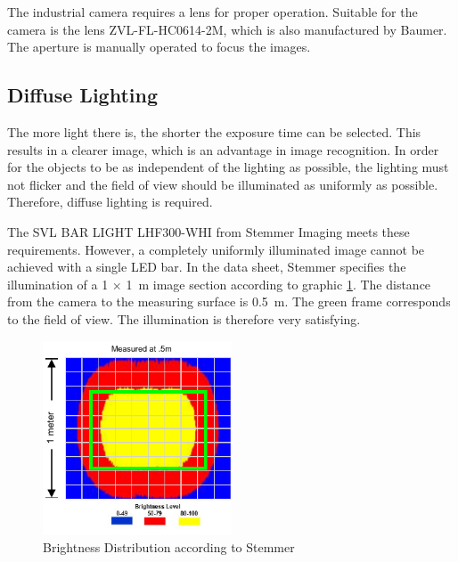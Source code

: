 The industrial camera requires a lens for proper operation.
Suitable for the camera is the lens ZVL-FL-HC0614-2M, which is also manufactured by Baumer.
The aperture is manually operated to focus the images.

\subsection{Diffuse Lighting}
\label{subsec:Lighting}
The more light there is, the shorter the exposure time can be selected.
This results in a clearer image, which is an advantage in image recognition.
In order for the objects to be as independent of the lighting as possible, the lighting must not flicker and the field of view should be illuminated as uniformly as possible.
Therefore, diffuse lighting is required.

The SVL BAR LIGHT LHF300-WHI from Stemmer Imaging meets these requirements.
However, a completely uniformly illuminated image cannot be achieved with a single LED bar.
In the data sheet, Stemmer specifies the illumination of a 1 $\times$ \SI{1}{m} image section according to graphic \ref{fig:lighting_LEDBAR}.
The distance from the camera to the measuring surface is \SI{0.5}{m}.
The green frame corresponds to the field of view.
The illumination is therefore very satisfying.

\begin{figure}[h]
	\centering
	\includegraphics[width=0.5\textwidth]{graphics/brightness_level.pdf}
	\caption{Brightness Distribution according to Stemmer \cite{stemmer_datasheet}}
	\label{fig:lighting_LEDBAR}
\end{figure}